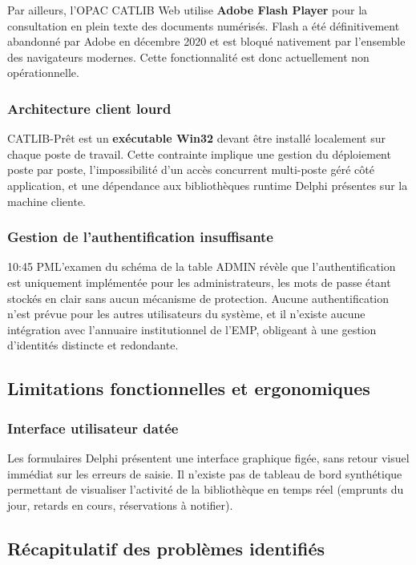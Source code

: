 \newpage
Par ailleurs, l'OPAC CATLIB Web utilise \textbf{Adobe Flash Player} pour
la consultation en plein texte des documents numérisés. Flash a été
définitivement abandonné par Adobe en décembre 2020 et est bloqué nativement
par l'ensemble des navigateurs modernes. Cette fonctionnalité est donc
actuellement non opérationnelle.

\subsubsection{Architecture client lourd}

CATLIB-Prêt est un \textbf{exécutable Win32} devant être installé localement
sur chaque poste de travail. Cette contrainte implique une gestion du
déploiement poste par poste, l'impossibilité d'un accès concurrent multi-poste
géré côté application, et une dépendance aux bibliothèques runtime Delphi
présentes sur la machine cliente.

\subsubsection{Gestion de l'authentification insuffisante}

10:45 PML'examen du schéma de la table ADMIN révèle que l'authentification est uniquement implémentée pour les administrateurs, les mots de passe étant stockés en clair sans aucun mécanisme de protection. Aucune authentification n'est prévue pour les autres utilisateurs du système, et il n'existe aucune intégration avec l'annuaire institutionnel de l'EMP, obligeant à une gestion d'identités distincte et redondante.

\subsection{Limitations fonctionnelles et ergonomiques}

\subsubsection{Interface utilisateur datée}

Les formulaires Delphi présentent une interface graphique figée, sans retour
visuel immédiat sur les erreurs de saisie. Il n'existe pas de tableau de bord
synthétique permettant de visualiser l'activité de la bibliothèque en temps
réel (emprunts du jour, retards en cours, réservations à notifier).

\subsection{Récapitulatif des problèmes identifiés}

